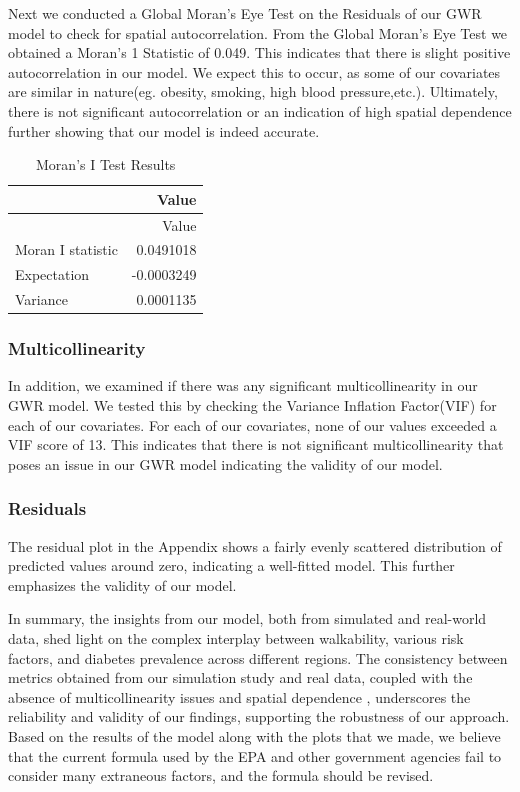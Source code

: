 \documentclass[
]{article}
\begin{document}
Next we conducted a Global Moran's Eye Test on the Residuals of our GWR
model to check for spatial autocorrelation. From the Global Moran's Eye
Test we obtained a Moran's 1 Statistic of 0.049. This indicates that
there is slight positive autocorrelation in our model. We expect this to
occur, as some of our covariates are similar in nature(eg. obesity,
smoking, high blood pressure,etc.). Ultimately, there is not significant
autocorrelation or an indication of high spatial dependence further
showing that our model is indeed accurate.

\begin{longtable}[]{@{}lr@{}}
\caption{Moran's I Test Results}\tabularnewline
\toprule\noalign{}
& Value \\
\midrule\noalign{}
\endfirsthead
\toprule\noalign{}
& Value \\
\midrule\noalign{}
\endhead
\bottomrule\noalign{}
\endlastfoot
Moran I statistic & 0.0491018 \\
Expectation & -0.0003249 \\
Variance & 0.0001135 \\
\end{longtable}

\subsubsection{Multicollinearity}\label{multicollinearity}

In addition, we examined if there was any significant multicollinearity
in our GWR model. We tested this by checking the Variance Inflation
Factor(VIF) for each of our covariates. For each of our covariates, none
of our values exceeded a VIF score of 13. This indicates that there is
not significant multicollinearity that poses an issue in our GWR model
indicating the validity of our model.

\subsubsection{Residuals}\label{residuals}

The residual plot in the Appendix shows a fairly evenly scattered
distribution of predicted values around zero, indicating a well-fitted
model. This further emphasizes the validity of our model.

In summary, the insights from our model, both from simulated and
real-world data, shed light on the complex interplay between
walkability, various risk factors, and diabetes prevalence across
different regions. The consistency between metrics obtained from our
simulation study and real data, coupled with the absence of
multicollinearity issues and spatial dependence , underscores the
reliability and validity of our findings, supporting the robustness of
our approach. Based on the results of the model along with the plots
that we made, we believe that the current formula used by the EPA and
other government agencies fail to consider many extraneous factors, and
the formula should be revised.
\end{document}
